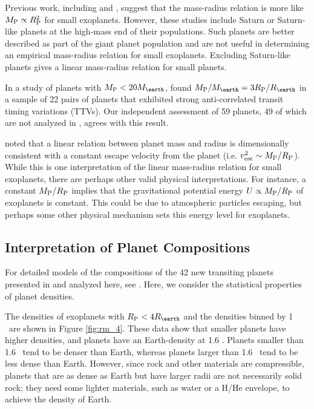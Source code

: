 \documentclass[11pt]{aastex}
\newcommand{\rspecial}{4 \rearth}
\begin{document}
Previous work, including \citet{Lissauer2011} and \citet{Weiss2013}, suggest that the mass-radius relation is more like $M_{\rm P} \propto R_{\rm P}^2$ for small exoplanets.  However, these studies include Saturn or Saturn-like planets at the high-mass end of their populations.  Such planets are better described as part of the giant planet population and are not useful in determining an empirical mass-radius relation for small exoplanets.  Excluding Saturn-like planets gives a linear mass-radius relation for small planets.

In a study of planets with $\mpl < 20\mearth$, \citet{WL2013} found $\mpl/\mearth = 3 \rpl/\rearth$ in a sample of 22 pairs of planets that exhibited strong anti-correlated transit timing variations (TTVs).  Our independent assessment of 59 planets, 49 of which are not analyzed in \citet{WL2013}, agrees with this result.

\citet{WL2013} noted that a linear relation between planet mass and radius is dimensionally consistent with a constant escape velocity from the planet (i.e. $v_{\mathrm{esc}}^2 \sim M_{\rm P}/R_{\rm P}$).  While this is one interpretation of the linear mass-radius relation for small exoplanets, there are perhaps other valid physical interpretations.  For instance, a constant $M_{\rm P}/R_{\rm P}$ implies that the gravitational potential energy $U \propto M_{\rm P}/R_{\rm P}$ of exoplanets is constant.  This could be due to atmospheric particles escaping, but perhaps some other physical mechanism sets this energy level for exoplanets.

\subsection{Interpretation of Planet Compositions}
For detailed models of the compositions of the 42 new transiting planets presented in \citet{Marcy2013} and analyzed here, see \citet{Rogers2013}.  Here, we consider the statistical properties of planet densities.

The densities of exoplanets with $\rpl < \rspecial$ and the densities binned by 1 \rearth\ are shown in Figure \ref{fig:rm_4}.  These data show that smaller planets have higher densities, and planets have an Earth-density at 1.6 \rearth.  Planets smaller than 1.6 \rearth\ tend to be denser than Earth, whereas planets larger than 1.6 \rearth\ tend to be less dense than Earth.  However, since rock and other materials are compressible, planets that are as dense as Earth but have larger radii are not necessarily solid rock; they need some lighter materials, such as water or a H/He envelope, to achieve the density of Earth.
\end{document}
